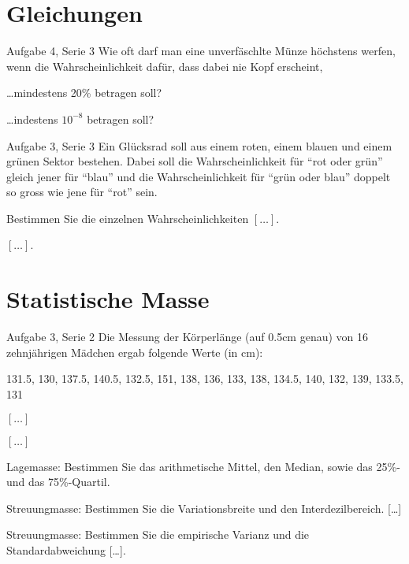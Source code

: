 \documentclass{beamer}
\begin{document}
\section{Gleichungen}
\begin{frame}{Aufgabe 4, Serie 3}
Wie oft darf man eine unverfäschlte Münze höchstens werfen, wenn die Wahrscheinlichkeit
dafür, dass dabei nie Kopf erscheint,
\begin{outline}
\item \dots mindestens 20\% betragen soll?
\item \dots indestens $10^{-8}$ betragen soll?
\end{outline}
\end{frame}

\begin{frame}{Aufgabe 3, Serie 3}
Ein Glücksrad soll aus einem roten, einem blauen und einem grünen Sektor
bestehen. Dabei soll die Wahrscheinlichkeit für ``rot oder grün'' gleich jener
für ``blau'' und die Wahrscheinlichkeit für ``grün oder blau'' doppelt so gross
wie jene für ``rot'' sein.
\begin{outline}
\item Bestimmen Sie die einzelnen Wahrscheinlichkeiten $[\dots]$.
\item $[\dots]$.
\end{outline}
\end{frame}

\section{Statistische Masse}
\begin{frame}{Aufgabe 3, Serie 2}
Die Messung der Körperlänge (auf 0.5cm genau) von 16 zehnjährigen Mädchen ergab
folgende Werte (in cm):

\begin{center}
131.5, 130, 137.5, 140.5, 132.5, 151, 138, 136, 133, 138, 134.5, 140, 132, 139, 133.5, 131
\end{center}
\begin{outline}
\item $[\dots]$
\item $[\dots]$
\item Lagemasse: Bestimmen Sie das arithmetische Mittel, den Median, sowie das 25\%-
und das 75\%-Quartil.
\item Streuungmasse: Bestimmen Sie die Variationsbreite und den Interdezilbereich. [\dots]
\item Streuungmasse: Bestimmen Sie die empirische Varianz und die Standardabweichung [\dots].
\end{outline}
\end{frame}
\end{document}
